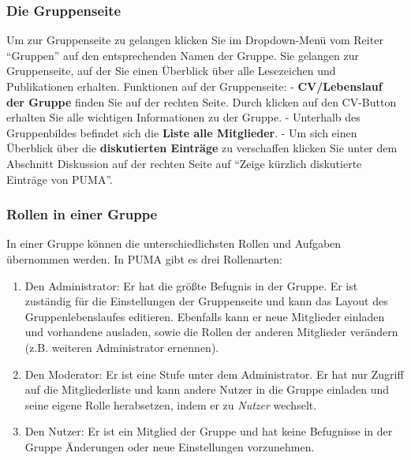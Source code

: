 \documentclass[a4paper,11pt,twoside]{scrbook}
\begin{document}
\subsubsection{Die Gruppenseite}
Um zur Gruppenseite zu gelangen klicken Sie im Dropdown-Menü vom Reiter  \enquote{Gruppen} auf den entsprechenden Namen der Gruppe. Sie gelangen zur Gruppenseite, auf der Sie einen Überblick über alle Lesezeichen und Publikationen erhalten.%
\newline
Funktionen auf der Gruppenseite:\newline
- \textbf{CV/Lebenslauf der Gruppe} finden Sie auf der rechten Seite. Durch klicken auf den CV-Button erhalten Sie alle wichtigen Informationen zu der Gruppe. \newline - Unterhalb des Gruppenbildes befindet sich die \textbf{Liste alle Mitglieder}. \newline - Um sich einen Überblick über die \textbf{diskutierten Einträge} zu verschaffen klicken Sie unter dem Abschnitt Diskussion auf der rechten Seite auf \enquote{Zeige kürzlich diskutierte Einträge von PUMA}.  
\subsubsection{Rollen in einer Gruppe}
In einer Gruppe können die unterschiedlichsten Rollen und Aufgaben übernommen werden. In PUMA gibt es drei Rollenarten:
\begin{enumerate}
    \item Den Administrator: Er hat die größte Befugnis in der Gruppe. Er ist zuständig für die Einstellungen der Gruppenseite und kann das Layout des Gruppenlebenslaufes editieren. Ebenfalls kann er neue Mitglieder einladen und vorhandene ausladen, sowie die Rollen der anderen Mitglieder verändern (z.B. weiteren Administrator ernennen).
    \item Den Moderator: Er ist eine Stufe unter dem Administrator. Er hat nur Zugriff auf die Mitgliederliste und kann andere Nutzer in die Gruppe einladen und seine eigene Rolle herabsetzen, indem er zu \textit{Nutzer} wechselt.
    \item Den Nutzer: Er ist ein Mitglied der Gruppe und hat keine Befugnisse in der Gruppe Änderungen oder neue Einstellungen vorzunehmen.
\end{enumerate}
\end{document}
